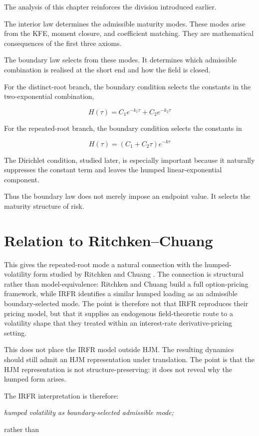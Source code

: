 \documentclass[11pt,oneside]{book}
\begin{document}
The analysis of this chapter reinforces the division introduced earlier.

The interior law determines the admissible maturity modes. These modes
arise from the KFE, moment closure, and coefficient matching. They are
mathematical consequences of the first three axioms.

The boundary law selects from these modes. It determines which
admissible combination is realised at the short end and how the field is
closed.

For the distinct-root branch, the boundary condition selects the
constants in the two-exponential combination,

\[
H(\tau) = C_1e^{-k_1\tau} + C_2e^{-k_2\tau}
\]

For the repeated-root branch, the boundary condition selects the
constants in

\[
H(\tau) = (C_1 + C_2\tau)e^{-k\tau}
\]

The Dirichlet condition, studied later, is especially important because
it naturally suppresses the constant term and leaves the humped
linear-exponential component.

Thus the boundary law does not merely impose an endpoint value. It
selects the maturity structure of risk.

\section{Relation to Ritchken--Chuang}

This gives the repeated-root mode a natural connection with the
humped-volatility form studied by Ritchken and Chuang
\cite{RitchkenChuang1999,RitchkenSankarasubramanian1995}. The connection
is structural rather than model-equivalence: Ritchken and Chuang build a
full option-pricing framework, while IRFR identifies a similar humped
loading as an admissible boundary-selected mode. The point is therefore
not that IRFR reproduces their pricing model, but that it supplies an
endogenous field-theoretic route to a volatility shape that they treated
within an interest-rate derivative-pricing setting.

This does not place the IRFR model outside HJM. The resulting dynamics
should still admit an HJM representation under translation. The point is
that the HJM representation is not structure-preserving: it does not
reveal why the humped form arises.

The IRFR interpretation is therefore:

\begin{center}\emph{humped volatility as boundary-selected admissible mode;}\end{center}
rather than
\end{document}
